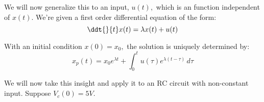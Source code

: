 

We will now generalize this to an input, $u(t),$ which is an function independent of $x(t)$.
We're given a first order differential equation of the form:
\begin{equation} \label{eqn:odeinput}
  \ddt{}{t} x(t) = \lambda x(t) + u(t)
\end{equation}

With an initial condition $x(0) = x_0,$ the solution is uniquely determined by:
\begin{equation} \label{eqn:odesol}
    x_{p}(t) = x_{0}e^{\lambda{}t} + \int_0^t \! u(\tau{})e^{\lambda{}(t - \tau{})} \, d\tau{}
\end{equation}






We will now take this insight and apply it to an RC circuit with non-constant input. Suppose $V_{c}(0) = 5V$.

